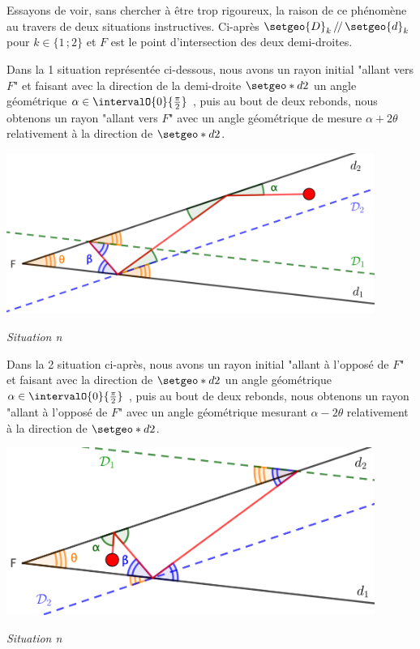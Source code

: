 Essayons de voir, sans chercher à être trop rigoureux, la raison de ce phénomène au travers de deux situations instructives. Ci-après $\setgeo{D}_k \, /\!/ \, \setgeo{d}_k$ pour $k \in \{ 1 \,; 2\}$ et $F$ est le point d'intersection des deux demi-droites.


\medskip


Dans la 1\iere{} situation représentée ci-dessous, nous avons un rayon initial "allant vers $F$" et faisant avec la direction de la demi-droite $\setgeo*{d}{2}$ un angle géométrique $\alpha \in \intervalO{0}{\frac{\pi}{2}}$ , puis au bout de deux rebonds, nous obtenons un rayon "allant vers $F$" avec un angle géométrique de mesure $\alpha + 2\theta$ relativement à la direction de $\setgeo*{d}{2}$.


\medskip


\begin{center}
	\includegraphics[width=12cm]{content/analysis-1.png}
	
	\itshape\small
	Situation n
	\label{situtation-1}
\end{center}


\medskip


Dans la 2\ieme{} situation ci-après, nous avons un rayon initial "allant à l'opposé de $F$" et faisant  avec la direction de $\setgeo*{d}{2}$ un angle géométrique $\alpha \in \intervalO{0}{\frac{\pi}{2}}$ , puis au bout de deux rebonds, nous obtenons un rayon "allant à l'opposé de $F$" avec un angle géométrique mesurant $\alpha - 2\theta$ relativement à la direction de $\setgeo*{d}{2}$.


\medskip


\begin{center}
	\includegraphics[width=12cm]{content/analysis-2.png}
	
	\itshape\small
	Situation n
	\label{situtation-2}
\end{center}


